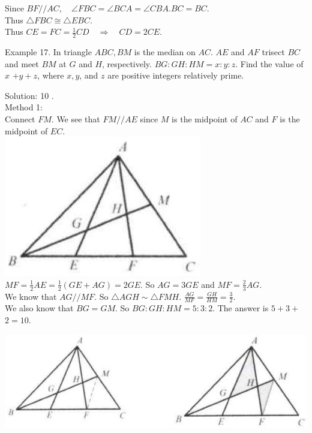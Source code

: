 \documentclass[10pt]{article}
\begin{document}
Since \(B F / / A C, \quad \angle F B C=\angle B C A=\angle C B A . B C=B C\).\\
Thus \(\triangle F B C \cong \triangle E B C\).\\
Thus \(C E=F C=\frac{1}{2} C D \quad \Rightarrow \quad C D=2 C E\).

Example 17. In triangle \(A B C, B M\) is the median on \(A C\). \(A E\) and \(A F\) trisect \(B C\) and meet \(B M\) at \(G\) and \(H\), respectively. \(B G: G H: H M=x: y: z\). Find the value of \(x\) \(+y+z\), where \(x, y\), and \(z\) are positive integers relatively prime.

Solution: 10 .\\
Method 1:\\
Connect \(F M\). We see that \(F M / / A E\) since \(M\) is the midpoint of \(A C\) and \(F\) is the midpoint of \(E C\).\\
\includegraphics[max width=\textwidth, center]{2025_04_17_97bc1f7e44d93c271a88g-118}\\
\(M F=\frac{1}{2} A E=\frac{1}{2}(G E+A G)=2 G E\). So \(A G=3 G E\) and \(M F=\frac{2}{3} A G\).\\
We know that \(A G / / M F\). So \(\triangle A G H \sim \triangle F M H\). \(\frac{A G}{M F}=\frac{G H}{H M}=\frac{3}{2}\).\\
We also know that \(B G=G M\). So \(B G: G H: H M=5: 3: 2\). The answer is \(5+3+\) \(2=10\).


\begin{center}
\includegraphics[max width=\textwidth]{2025_04_17_97bc1f7e44d93c271a88g-119}
\end{center}
\end{document}
